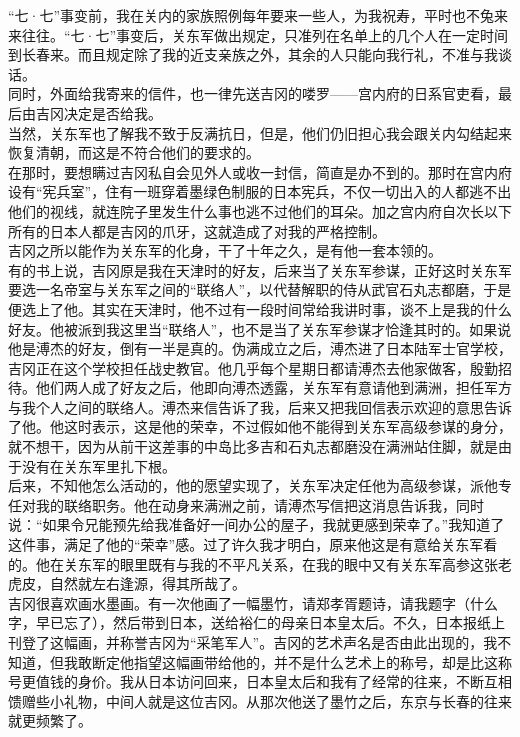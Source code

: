 “七·七”事变前，我在关内的家族照例每年要来一些人，为我祝寿，平时也不兔来来往往。“七·七”事变后，关东军做出规定，只准列在名单上的几个人在一定时间到长春来。而且规定除了我的近支亲族之外，其余的人只能向我行礼，不准与我谈话。\\

同时，外面给我寄来的信件，也一律先送吉冈的喽罗——宫内府的日系官吏看，最后由吉冈决定是否给我。\\

当然，关东军也了解我不致于反满抗日，但是，他们仍旧担心我会跟关内勾结起来恢复清朝，而这是不符合他们的要求的。\\

在那时，要想瞒过吉冈私自会见外人或收一封信，简直是办不到的。那时在宫内府设有“宪兵室”，住有一班穿着墨绿色制服的日本宪兵，不仅一切出入的人都逃不出他们的视线，就连院子里发生什么事也逃不过他们的耳朵。加之宫内府自次长以下所有的日本人都是吉冈的爪牙，这就造成了对我的严格控制。\\

吉冈之所以能作为关东军的化身，干了十年之久，是有他一套本领的。\\

有的书上说，吉冈原是我在天津时的好友，后来当了关东军参谋，正好这时关东军要选一名帝室与关东军之间的“联络人”，以代替解职的侍从武官石丸志都磨，于是便选上了他。其实在天津时，他不过有一段时间常给我讲时事，谈不上是我的什么好友。他被派到我这里当“联络人”，也不是当了关东军参谋才恰逢其时的。如果说他是溥杰的好友，倒有一半是真的。伪满成立之后，溥杰进了日本陆军士官学校，吉冈正在这个学校担任战史教官。他几乎每个星期日都请溥杰去他家做客，殷勤招待。他们两人成了好友之后，他即向溥杰透露，关东军有意请他到满洲，担任军方与我个人之间的联络人。溥杰来信告诉了我，后来又把我回信表示欢迎的意思告诉了他。他这时表示，这是他的荣幸，不过假如他不能得到关东军高级参谋的身分，就不想干，因为从前干这差事的中岛比多吉和石丸志都磨没在满洲站住脚，就是由于没有在关东军里扎下根。\\

后来，不知他怎么活动的，他的愿望实现了，关东军决定任他为高级参谋，派他专任对我的联络职务。他在动身来满洲之前，请溥杰写信把这消息告诉我，同时说：“如果令兄能预先给我准备好一间办公的屋子，我就更感到荣幸了。”我知道了这件事，满足了他的“荣幸”感。过了许久我才明白，原来他这是有意给关东军看的。他在关东军的眼里既有与我的不平凡关系，在我的眼中又有关东军高参这张老虎皮，自然就左右逢源，得其所哉了。\\

吉冈很喜欢画水墨画。有一次他画了一幅墨竹，请郑孝胥题诗，请我题字（什么字，早已忘了），然后带到日本，送给裕仁的母亲日本皇太后。不久，日本报纸上刊登了这幅画，并称誉吉冈为“采笔军人”。吉冈的艺术声名是否由此出现的，我不知道，但我敢断定他指望这幅画带给他的，并不是什么艺术上的称号，却是比这称号更值钱的身价。我从日本访问回来，日本皇太后和我有了经常的往来，不断互相馈赠些小礼物，中间人就是这位吉冈。从那次他送了墨竹之后，东京与长春的往来就更频繁了。\\

